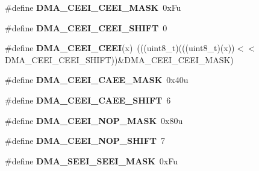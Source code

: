 \begin{DoxyCompactItemize}
\item 
\#define {\bfseries D\+M\+A\+\_\+\+C\+E\+E\+I\+\_\+\+C\+E\+E\+I\+\_\+\+M\+A\+SK}~0x\+Fu\hypertarget{group__DMA__Register__Masks_gaac1e3fb6ff551f58fe6c43c5b10a6186}{}\label{group__DMA__Register__Masks_gaac1e3fb6ff551f58fe6c43c5b10a6186}

\item 
\#define {\bfseries D\+M\+A\+\_\+\+C\+E\+E\+I\+\_\+\+C\+E\+E\+I\+\_\+\+S\+H\+I\+FT}~0\hypertarget{group__DMA__Register__Masks_ga66ffe3efeb446f55654d3ac90abf1cb6}{}\label{group__DMA__Register__Masks_ga66ffe3efeb446f55654d3ac90abf1cb6}

\item 
\#define {\bfseries D\+M\+A\+\_\+\+C\+E\+E\+I\+\_\+\+C\+E\+EI}(x)~(((uint8\+\_\+t)(((uint8\+\_\+t)(x))$<$$<$D\+M\+A\+\_\+\+C\+E\+E\+I\+\_\+\+C\+E\+E\+I\+\_\+\+S\+H\+I\+FT))\&D\+M\+A\+\_\+\+C\+E\+E\+I\+\_\+\+C\+E\+E\+I\+\_\+\+M\+A\+SK)\hypertarget{group__DMA__Register__Masks_gaf1db6175a973e40e11a4ac87ee231096}{}\label{group__DMA__Register__Masks_gaf1db6175a973e40e11a4ac87ee231096}

\item 
\#define {\bfseries D\+M\+A\+\_\+\+C\+E\+E\+I\+\_\+\+C\+A\+E\+E\+\_\+\+M\+A\+SK}~0x40u\hypertarget{group__DMA__Register__Masks_ga386c3018389f0adce8b163c90bc171b7}{}\label{group__DMA__Register__Masks_ga386c3018389f0adce8b163c90bc171b7}

\item 
\#define {\bfseries D\+M\+A\+\_\+\+C\+E\+E\+I\+\_\+\+C\+A\+E\+E\+\_\+\+S\+H\+I\+FT}~6\hypertarget{group__DMA__Register__Masks_ga389695175eaab975f78ed66669e467df}{}\label{group__DMA__Register__Masks_ga389695175eaab975f78ed66669e467df}

\item 
\#define {\bfseries D\+M\+A\+\_\+\+C\+E\+E\+I\+\_\+\+N\+O\+P\+\_\+\+M\+A\+SK}~0x80u\hypertarget{group__DMA__Register__Masks_ga5b85e28933ce4120f8a8542972b92115}{}\label{group__DMA__Register__Masks_ga5b85e28933ce4120f8a8542972b92115}

\item 
\#define {\bfseries D\+M\+A\+\_\+\+C\+E\+E\+I\+\_\+\+N\+O\+P\+\_\+\+S\+H\+I\+FT}~7\hypertarget{group__DMA__Register__Masks_gaa6681149d6d175500734c3ae71842eba}{}\label{group__DMA__Register__Masks_gaa6681149d6d175500734c3ae71842eba}

\item 
\#define {\bfseries D\+M\+A\+\_\+\+S\+E\+E\+I\+\_\+\+S\+E\+E\+I\+\_\+\+M\+A\+SK}~0x\+Fu\hypertarget{group__DMA__Register__Masks_ga67059eac1eff574cd4934a35a0476015}{}\label{group__DMA__Register__Masks_ga67059eac1eff574cd4934a35a0476015}


\end{DoxyCompactItemize}
